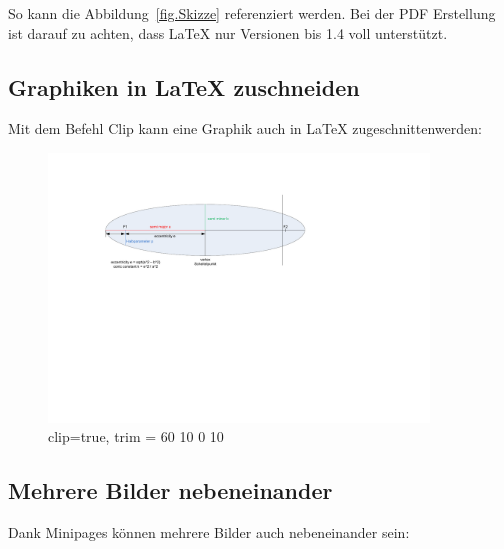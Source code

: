 So kann die Abbildung~\ref{fig.Skizze} referenziert werden. Bei der PDF Erstellung ist darauf zu achten, dass LaTeX nur Versionen bis 1.4 voll unterstützt. 



\subsection{Graphiken in LaTeX zuschneiden}\label{zuschneiden}
Mit dem Befehl Clip kann eine Graphik auch in LaTeX zugeschnittenwerden:

\begin{figure}[H]
	\centering
		\includegraphics[width=0.9\textwidth, clip=true, trim = 80 10 0 10]{images/visio/visio.pdf}  %
	\caption{clip=true, trim = 60 10 0 10}
	\label{fig.SkizzeZugeschnitten}
\end{figure}




\subsection{Mehrere Bilder nebeneinander}\label{nebeneinander}
Dank Minipages können mehrere Bilder auch nebeneinander sein:

